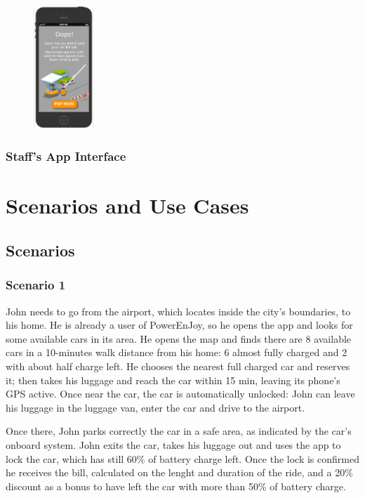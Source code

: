 \documentclass[11pt]{article} %
\newcommand{\pecomma}{PowerEnJoy, }
\begin{document}
\begin{figure}[H]
	\includegraphics[width=0.2\textwidth]{mockup/10PendingBills.png}
	
\end{figure}
\subsubsection{Staff's App Interface}
  

\newpage
\section{Scenarios and Use Cases}

\subsection{Scenarios}

\subsubsection{Scenario 1}
John needs to go from the airport, which locates inside the city's boundaries, to his home. He is already a user of \pecomma so he opens the app and looks for some available cars in its area. He opens the map and finds there are 8 available cars in a 10-minutes walk distance from his home: 6 almost fully charged and 2 with about half charge left. He chooses the nearest full charged car and reserves it; then takes his luggage and reach the car within 15 min, leaving its phone's GPS active. Once near the car, the car is automatically unlocked: John can leave his luggage in the luggage van, enter the car and drive to the airport.

Once there, John parks correctly the car in a safe area, as indicated by the car's onboard system. John exits the car, takes his luggage out and uses the app to lock the car, which has still 60\% of battery charge left. Once the lock is confirmed he receives the bill, calculated on the lenght and duration of the ride, and a 20\% discount as a bonus to have left the car with more than 50\% of battery charge.
\end{document}
